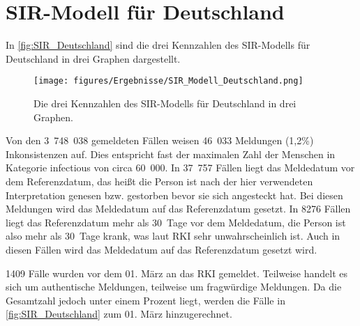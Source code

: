 \section{SIR-Modell für Deutschland}\label{sec:Resultate-SIR}
In \autoref{fig:SIR_Deutschland} sind die drei Kennzahlen des SIR-Modells für Deutschland in drei Graphen dargestellt.
\begin{figure}[H]
    \centering
    \texttt{[image: figures/Ergebnisse/SIR\_Modell\_Deutschland.png]}
    \caption{Die drei Kennzahlen des SIR-Modells für Deutschland in drei Graphen.}
    \label{fig:SIR_Deutschland}
\end{figure}

Von den 3~748~038 gemeldeten Fällen weisen 46~033 Meldungen (1,2\%) Inkonsistenzen auf. Dies entspricht fast der maximalen Zahl der Menschen in Kategorie \glqq{}infectious\grqq{} von circa 60~000.
In 37~757 Fällen liegt das Meldedatum vor dem Referenzdatum, das heißt die Person ist nach der hier verwendeten Interpretation genesen bzw. gestorben bevor sie sich angesteckt hat. Bei diesen Meldungen wird das Meldedatum auf das Referenzdatum gesetzt.
In 8276 Fällen liegt das Referenzdatum mehr als 30~Tage vor dem Meldedatum, die Person ist also mehr als 30~Tage krank, was laut RKI sehr unwahrscheinlich ist.\autocite{RKI_Bulletin} Auch in diesen Fällen wird das Meldedatum auf das Referenzdatum gesetzt wird.

1409 Fälle wurden vor dem 01. März an das RKI gemeldet. Teilweise handelt es sich um authentische Meldungen, teilweise um fragwürdige Meldungen. Da die Gesamtzahl jedoch unter einem Prozent liegt, werden die Fälle in \autoref{fig:SIR_Deutschland} zum 01. März hinzugerechnet.